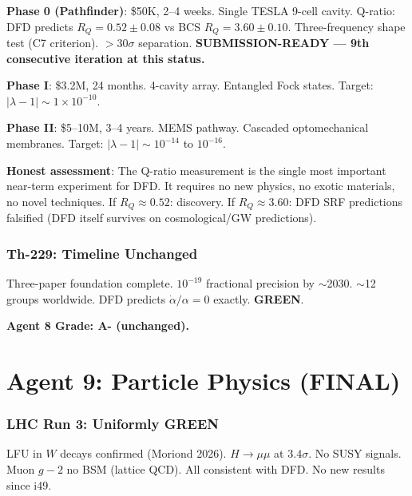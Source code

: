 \documentclass[11pt,a4paper]{article}
\newcommand{\GREEN}{\textcolor{dfdgreen}{\textbf{GREEN}}}
\begin{document}
\begin{tcolorbox}[colback=blue!5!white, colframe=blue!60!black,
  title={SQMS Detection Programme: Final Handoff Status}]

\textbf{Phase 0 (Pathfinder)}: \$50K, 2--4 weeks. Single TESLA 9-cell cavity. Q-ratio: DFD predicts $R_Q = 0.52 \pm 0.08$ vs BCS $R_Q = 3.60 \pm 0.10$. Three-frequency shape test (C7 criterion). $>30\sigma$ separation. \textbf{SUBMISSION-READY --- 9th consecutive iteration at this status.}

\textbf{Phase I}: \$3.2M, 24 months. 4-cavity array. Entangled Fock states. Target: $|\lambda-1| \sim 1 \times 10^{-10}$.

\textbf{Phase II}: \$5--10M, 3--4 years. MEMS pathway. Cascaded optomechanical membranes. Target: $|\lambda-1| \sim 10^{-14}$ to $10^{-16}$.

\textbf{Honest assessment}: The Q-ratio measurement is the single most important near-term experiment for DFD. It requires no new physics, no exotic materials, no novel techniques. If $R_Q \approx 0.52$: discovery. If $R_Q \approx 3.60$: DFD SRF predictions falsified (DFD itself survives on cosmological/GW predictions).
\end{tcolorbox}

\section{Th-229: Timeline Unchanged}

Three-paper foundation complete. $10^{-19}$ fractional precision by $\sim$2030. $\sim$12 groups worldwide. DFD predicts $\dot{\alpha}/\alpha = 0$ exactly. \GREEN.

\textbf{Agent 8 Grade: A- (unchanged).}


\part{Agent 9: Particle Physics (FINAL)}
\label{part:agent9}

\section{LHC Run 3: Uniformly GREEN}

LFU in $W$ decays confirmed (Moriond 2026). $H \to \mu\mu$ at $3.4\sigma$. No SUSY signals. Muon $g-2$ no BSM (lattice QCD). All consistent with DFD. No new results since i49.
\end{document}
